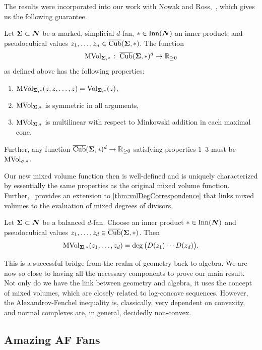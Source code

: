 \documentclass[12pt,oneside]{../../sfsuthesis}
\begin{document}
The results were incorporated into our work with Nowak and Ross,~\cite[Proposition~3.1]{nowakMixedVolumesNormal2023}, which gives us the following guarantee.
\begin{proposition}
    Let \( {\bm{\Sigma}} \subset \bm{N} \) be a marked, simplicial \( d \)-fan, \( \ast \in \operatorname{Inn}(\bm{N}) \) an inner product, and pseudocubical values \( z_1, \dots, z_n \in \operatorname{\overline{Cub}}({\bm{\Sigma}}, \ast)\).
    The function
    \[
        \operatorname{MVol}_{{\bm{\Sigma}}, \ast}\,:\; \operatorname{\overline{Cub}}({\bm{\Sigma}}, \ast)^d \to \mathbb{R}_{\geq 0}
    \]
    as defined above has the following properties:
    \begin{enumerate}
        \item \( \operatorname{MVol}_{{\bm{\Sigma}}, \ast}(z, z, \dots, z) = \operatorname{Vol}_{{\bm{\Sigma}}, \ast}(z) \),
        \item \( \operatorname{MVol}_{{\bm{\Sigma}}, \ast} \) is symmetric in all arguments,
        \item \( \operatorname{MVol}_{{\bm{\Sigma}}, \ast} \) is multilinear with respect to Minkowski addition in each maximal cone.
    \end{enumerate}

    Further, any function \( \operatorname{\overline{Cub}}({\bm{\Sigma}}, \ast)^d \to \mathbb{R}_{\geq 0} \) satisfying properties 1--3 must be \( \operatorname{MVol}_{\sigma, \ast} \).
\end{proposition}
Our new mixed volume function then is well-defined and is uniquely characterized by essentially the same properties as the original mixed volume function.
Further,~\cite[Theorem~3.6]{nowakMixedVolumesNormal2023} provides an extension to \th\ref{thm:volDegCorrespondence} that links mixed volumes to the evaluation of mixed degrees of divisors.
\begin{theorem}\th\label{thm:mixedDeg}
    Let \( {\bm{\Sigma}} \subset \bm{N} \) be a balanced \( d \)-fan.
    Choose an inner product \( \ast \in \operatorname{Inn}(\bm{N}) \) and pseudocubical values \( z_1, \dots, z_d \in \operatorname{\overline{Cub}}( {\bm{\Sigma}}, \ast ) \).
    Then
    \[
        \operatorname{MVol}_{{\bm{\Sigma}}, \ast}(z_1, \dots, z_d) = \deg\big( D(z_1) \cdots D(z_d) \big).
    \]
\end{theorem}
This is a successful bridge from the realm of geometry back to algebra.
We are now so close to having all the necessary components to prove our main result.
Not only do we have the link between geometry and algebra, it uses the concept of mixed volumes, which are closely related to log-concave sequences.
However, the Alexandrov-Fenchel inequality is, classically, very dependent on convexity, and normal complexes are, in general, decidedly non-convex.

\subsection{Amazing AF Fans}
\end{document}

